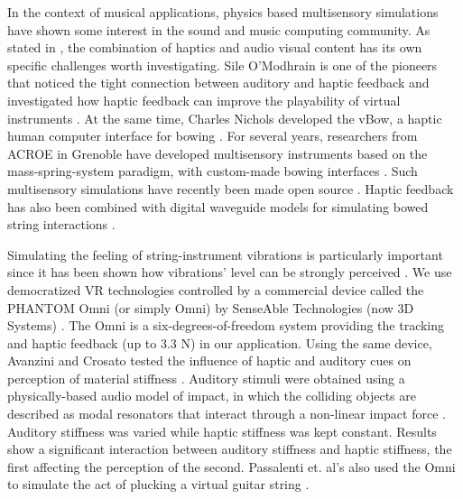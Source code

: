 In the context of musical applications, physics based multisensory simulations have shown some interest in the sound and music computing community. 
As stated in 
\cite{danieau2012enhancing}, the combination of haptics and audio visual content has its own specific challenges worth investigating.
Sile O'Modhrain is one of the pioneers that noticed the tight connection between auditory and haptic feedback and investigated how haptic feedback can improve the playability of virtual instruments \cite{o2001playing}.
At the same time, Charles Nichols developed the vBow, a haptic human computer interface for bowing \cite{nichols2002vbow}.
For several years, researchers from ACROE in Grenoble have developed multisensory instruments based on the mass-spring-system paradigm, with custom-made bowing interfaces \cite{florens1990modeles,luciani2005action}.
Such multisensory simulations have recently been made open source \cite{villeneuve2019mass}.
Haptic feedback has also been combined with digital waveguide models for simulating bowed string interactions \cite{sinclair2009audio}.

Simulating the feeling of string-instrument vibrations is particularly important since it has been shown how vibrations' level can be strongly perceived \cite{askenfelt1992vibration}. 
We use democratized VR technologies controlled by a commercial device called the PHANTOM Omni (or simply Omni) by SenseAble Technologies (now 3D Systems) \cite{phantom}.
The Omni is a six-degrees-of-freedom system providing the tracking and haptic feedback (up to 3.3 N) in our application.
Using the same device, Avanzini and Crosato tested the influence of haptic and auditory cues on perception of material stiffness   \cite{avanzini2006}.
Auditory stimuli were obtained using a physically-based audio model of impact, in which the colliding objects are described as modal resonators that interact through a non-linear impact force \cite{avanzini2004physical}.
Auditory stiffness was varied while haptic stiffness was kept constant. Results show a significant interaction between auditory stiffness and haptic stiffness, the first affecting the perception of the second. Passalenti et. al's also used the Omni to simulate the act of plucking a virtual guitar string \cite{passalenti2019a, passalenti2019b, Fontana2020}.


